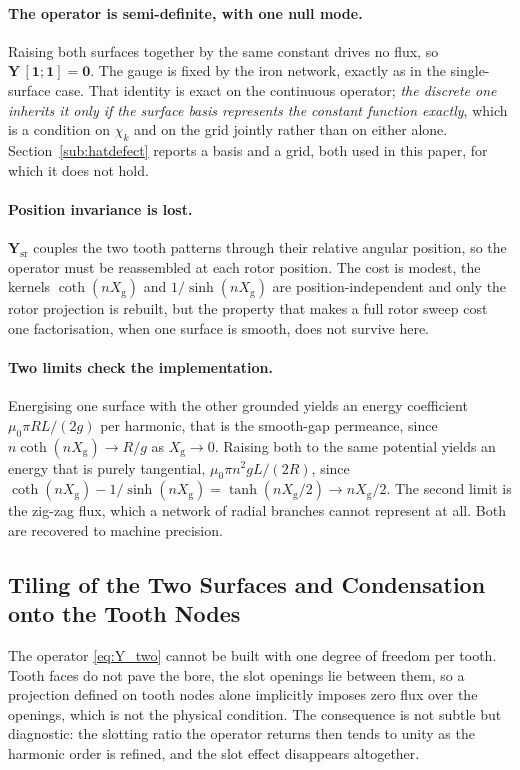 \documentclass[10pt,a4paper,twocolumn]{article}
\newcommand{\Xg}{X_{\mathrm{g}}}
\theoremstyle{plain}
\theoremstyle{remark}
\begin{document}
\paragraph{The operator is semi-definite, with one null mode.}
Raising both surfaces together by the same constant drives no flux, so
$\bm{Y}\,[\bm{1};\bm{1}]=\bm{0}$. The gauge is fixed by the iron
network, exactly as in the single-surface case. That identity is exact on
the continuous operator; \emph{the discrete one inherits it only if the
surface basis represents the constant function exactly}, which is a
condition on $\chi_k$ and on the grid jointly rather than on either
alone. Section~\ref{sub:hatdefect} reports a basis and a grid, both used
in this paper, for which it does not hold.

\paragraph{Position invariance is lost.}
$\bm{Y}_{\mathrm{sr}}$ couples the two tooth patterns through their
relative angular position, so the operator must be reassembled at each
rotor position. The cost is modest, the kernels $\coth(n\Xg)$ and
$1/\sinh(n\Xg)$ are position-independent and only the rotor projection
is rebuilt, but the property that makes a full rotor sweep cost one
factorisation, when one surface is smooth, does not survive here.

\paragraph{Two limits check the implementation.}
Energising one surface with the other grounded yields an energy
coefficient $\mu_0\pi R L/(2g)$ per harmonic, that is the smooth-gap
permeance, since $n\coth(n\Xg)\to R/g$ as $\Xg\to0$. Raising both to the
same potential yields an energy that is purely tangential,
$\mu_0\pi n^2 g L/(2R)$, since
$\coth(n\Xg)-1/\sinh(n\Xg)=\tanh(n\Xg/2)\to n\Xg/2$. The second limit is
the zig-zag flux, which a network of radial branches cannot represent at
all. Both are recovered to machine precision.

\subsection{Tiling of the Two Surfaces and Condensation onto the Tooth Nodes}
\label{sub:tiling}

The operator \eqref{eq:Y_two} cannot be built with one degree of freedom
per tooth. Tooth faces do not pave the bore, the slot openings lie
between them, so a projection defined on tooth nodes alone implicitly
imposes zero flux over the openings, which is not the physical
condition. The consequence is not subtle but diagnostic: the slotting
ratio the operator returns then tends to unity as the harmonic order is
refined, and the slot effect disappears altogether.
\end{document}
